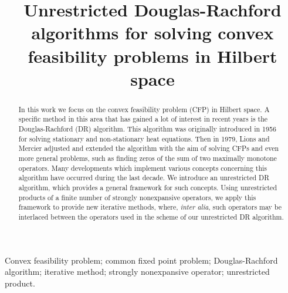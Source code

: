 \documentclass[]{interact}
\theoremstyle{plain}%
\theoremstyle{definition}
\theoremstyle{remark}
\begin{document}

\title{Unrestricted Douglas-Rachford algorithms for solving convex feasibility problems in Hilbert space}

\author{
}

\maketitle

\begin{abstract}
In this work we focus on the convex feasibility problem (CFP) in Hilbert space. A specific method in this area that has gained
a lot of interest in recent years is the Douglas-Rachford (DR) algorithm.
This algorithm was originally introduced in 1956 for solving stationary and non-stationary heat equations. Then in 1979, Lions and Mercier
adjusted and extended the algorithm with the aim of solving CFPs and even more general problems, such as finding zeros of the sum of two maximally monotone operators.
Many developments which implement various concepts concerning this algorithm have occurred during the last decade. We introduce an \color{black}unrestricted \color{black}
DR algorithm, which provides a general framework for such concepts. Using \color{black}unrestricted \color{black} products of a finite number of strongly nonexpansive
operators, we apply \color{black}this framework \color{black} to provide new iterative methods, where, \textit{inter alia}, such operators may be interlaced between
the operators used in the scheme of our \color{black}unrestricted \color{black} DR algorithm.
\end{abstract}

\begin{keywords}
Convex feasibility problem; common fixed point problem; Douglas-Rachford algorithm; iterative
method; strongly nonexpansive operator; \color{black}unrestricted \color{black} product.
\end{keywords}
\end{document}
